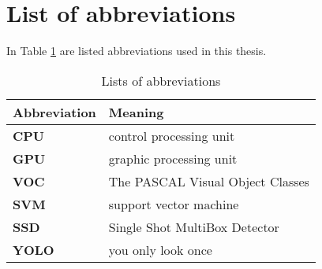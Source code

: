 \section{List of abbreviations}\label{ape:abbreviations}

In Table \ref{table:abbreviations} are listed abbreviations used in this thesis.

\begin{table}[!htb]
\centering
\begin{tabular}{ll}
\hline
\textbf{Abbreviation} & \textbf{Meaning} \\
\hline

\textbf{CPU} & control processing unit \\
\textbf{GPU} & graphic processing unit \\
\textbf{VOC} & The PASCAL Visual Object Classes\\
\textbf{SVM} & support vector machine \\
\textbf{SSD} & Single Shot MultiBox Detector \\
\textbf{YOLO} & you only look once \\

\hline
\end{tabular}
\caption{Lists of abbreviations}
\label{table:abbreviations}
\end{table}